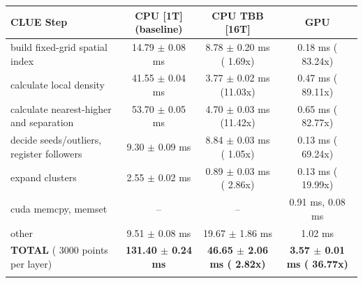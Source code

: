     \begin{tabular}{l|c|c|c}
    \hline
    CLUE Step                                 & CPU [1T] (baseline)         & CPU TBB [16T]                         & GPU                       \\ \hline
    build fixed-grid spatial index            &  14.79 $\pm$  0.08 ms       &   8.78 $\pm$  0.20 ms ( 1.69x)        &   0.18 ms ( 83.24x)       \\
    calculate local density                   &  41.55 $\pm$  0.04 ms       &   3.77 $\pm$  0.02 ms (11.03x)        &   0.47 ms ( 89.11x)       \\
    calculate nearest-higher and separation   &  53.70 $\pm$  0.05 ms       &   4.70 $\pm$  0.03 ms (11.42x)        &   0.65 ms ( 82.77x)       \\
    decide seeds/outliers, register followers &   9.30 $\pm$  0.09 ms       &   8.84 $\pm$  0.03 ms ( 1.05x)        &   0.13 ms ( 69.24x)       \\
    expand clusters                           &   2.55 $\pm$  0.02 ms       &   0.89 $\pm$  0.03 ms ( 2.86x)        &   0.13 ms ( 19.99x)       \\ \hline
    cuda memcpy, memset                       & --                          & --                                    &   0.91 ms,   0.08 ms      \\
    other                                     &   9.51 $\pm$  0.08 ms       &  19.67 $\pm$  1.86 ms                 &   1.02 ms                 \\ \hline
    \textbf{TOTAL} ( 3000 points per layer)   & \textbf{131.40 $\pm$  0.24 ms} & \textbf{ 46.65 $\pm$  2.06 ms ( 2.82x)} & \textbf{  3.57 $\pm$  0.01 ms ( 36.77x)}  \\
    \hline
    \multicolumn{4}{c}{}
    \end{tabular}
    \linebreak



